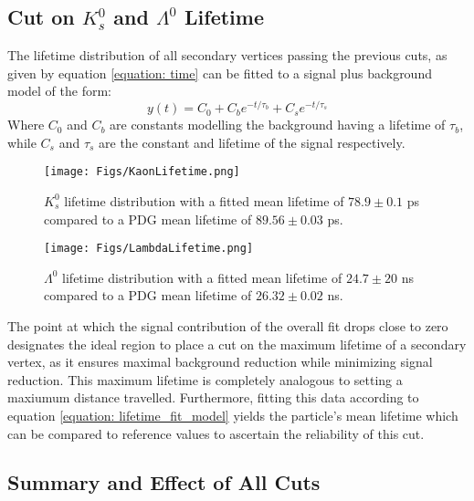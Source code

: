 \documentclass{article}
\begin{document}
\subsection{Cut on $K_s^0$ and $\Lambda^0$ Lifetime}\label{section: lifetime}
The lifetime distribution of all secondary vertices passing the previous cuts, as given by equation \ref{equation: time} can be 
fitted to a signal plus background model of the form:
\begin{equation}
    \label{equation: lifetime_fit_model}
    y(t) = C_0 + C_be^{-t/\tau_b} + C_se^{-t/\tau_s}
\end{equation}
Where $C_0$ and $C_b$ are constants modelling the background having a lifetime of $\tau_b$, while $C_s$ and $\tau_s$
are the constant and lifetime of the signal respectively.

\begin{figure}[!h]
\centering
\begin{minipage}{.48\textwidth}
\centering
\texttt{[image: Figs/KaonLifetime.png]}
\caption{\small $K_s^0$ lifetime distribution with a fitted mean lifetime of 
         $78.9 \pm 0.1$ \unit{ps} compared to a PDG mean lifetime of $89.56 \pm 0.03$ \unit{ps}\cite{KBranchingRatio}.}
\label{figure: KDistance}
\end{minipage}%
\hfill
\begin{minipage}{.48\textwidth}
\centering
\texttt{[image: Figs/LambdaLifetime.png]}
\caption{\small $\Lambda^0$ lifetime distribution with a fitted mean lifetime of 
         $24.7 \pm 20$ \unit{ns} compared to a PDG mean lifetime of $26.32 \pm 0.02$ \unit{ns}\cite{LBranchingRatio}.}
\label{figure: LDistance}
\end{minipage}
\end{figure}

The point at which the signal contribution of the overall fit drops close to zero 
designates the ideal region to place a cut on the maximum lifetime of a secondary vertex,
as it ensures maximal background reduction while minimizing signal reduction. This 
maximum lifetime is completely analogous to setting a maxiumum distance travelled.
Furthermore, fitting this data according to equation \ref{equation: lifetime_fit_model}
yields the particle's mean lifetime which can be compared to reference values to 
ascertain the reliability of this cut.

\subsection{Summary and Effect of All Cuts}\label{section: All Cuts}
\end{document}
